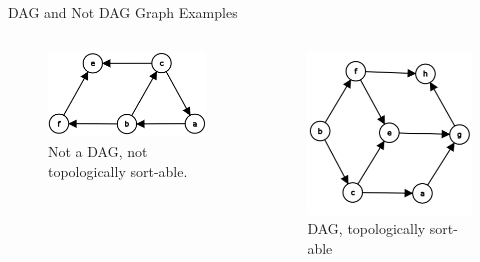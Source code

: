 \documentclass[aspectratio=169]{beamer}%
\begin{document}
\begin{frame}{DAG and Not DAG Graph Examples}
\begin{columns}
    \begin{column}{.48\textwidth}
        \begin{figure}
            \centering
            \includegraphics[width = .9\linewidth]{graph10.png}
            \caption{Not a DAG, not topologically sort-able.}
        \end{figure}
    \end{column}
    \hfill
    \begin{column}{.48\textwidth}
        \begin{figure}
            \centering
            \includegraphics[width = .8\linewidth]{graph11.png}
            \caption{DAG, topologically sort-able}
        \end{figure}
    \end{column}
\end{columns}
\end{frame}
\end{document}
